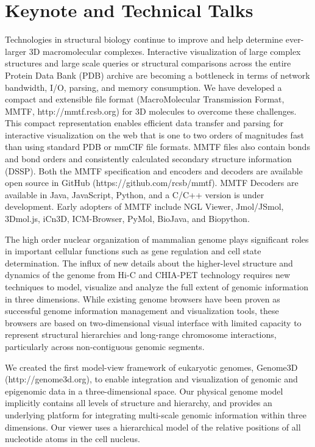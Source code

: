 \documentclass[a4paper]{article}
\begin{document}
\section{Keynote and Technical Talks}

Technologies in structural biology continue to improve and help determine ever-larger 3D macromolecular complexes. Interactive visualization of large complex structures and large scale queries or structural comparisons across the entire Protein Data Bank (PDB) archive are becoming a bottleneck in terms of network bandwidth, I/O, parsing, and memory consumption. We have developed a compact and extensible file format (MacroMolecular Transmission Format, MMTF, http://mmtf.rcsb.org) for 3D molecules to overcome these challenges. This compact representation enables efficient data transfer and parsing for interactive visualization on the web that is one to two orders of magnitudes fast than using standard PDB or mmCIF file formats. MMTF files also contain bonds and bond orders and consistently calculated secondary structure information (DSSP). Both the MMTF specification and encoders and decoders are available open source in GitHub (https://github.com/rcsb/mmtf). MMTF Decoders are available in Java, JavaScript, Python, and a C/C++ version is under development. Early adopters of MMTF include NGL Viewer, Jmol/JSmol, 3Dmol.js, iCn3D, ICM-Browser, PyMol, BioJava, and Biopython.



The high order nuclear organization of mammalian genome plays significant
roles in important cellular functions such as gene regulation and cell
state determination.  The influx of new details about the higher-level
structure and dynamics of the genome from Hi-C and CHIA-PET technology
requires new techniques to model, visualize and analyze the full extent of
genomic information in three dimensions. While existing genome browsers
have been proven as successful genome information management and
visualization tools, these browsers are based on two-dimensional visual
interface with limited capacity to represent structural hierarchies and
long-range chromosome interactions, particularly across non-contiguous
genomic segments. 

We created the first model-view framework of eukaryotic
genomes, Genome3D (http://genome3d.org), to enable integration and
visualization of genomic and epigenomic data in a three-dimensional space.
Our physical genome model implicitly contains all levels of structure and
hierarchy, and provides an underlying platform for integrating multi-scale
genomic information within three dimensions. Our viewer uses a
hierarchical model of the relative positions of all nucleotide atoms in
the cell nucleus. 
\end{document}
